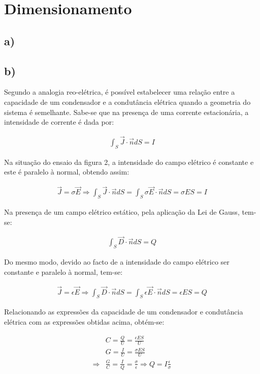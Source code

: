 \documentclass[portuguese, a4paper, titlepage]{article}
\begin{document}
	\section{Dimensionamento}
	\subsection{a)}

	\subsection{b)}
	Segundo a analogia reo-elétrica, é possível estabelecer uma relação entre a capacidade de um condensador e a condutância elétrica quando a geometria do sistema é semelhante.
	Sabe-se que na presença de uma corrente estacionária, a intensidade de corrente é dada por:

	\begin{align*}
		\int _ { S } \vec{J} \cdot \vec{n} d S = I
	\end{align*}

	Na situação do ensaio da figura 2, a intensidade do campo elétrico é constante e este é paralelo à normal, obtendo assim:

	\begin{align*}
		\vec{J} = \sigma \vec{E} \Rightarrow \int _ { S } \vec{J} \cdot \vec{n} d S = \int _ { S } \sigma \vec{E} \cdot \vec{n} d S  = \sigma E S = I
	\end{align*}

	Na presença de um campo elétrico estático, pela aplicação da Lei de Gauss, tem-se:

	\begin{align*}
			\int _ { S } \vec{D} \cdot \vec{n} d S = Q
	\end{align*}

	Do mesmo modo, devido ao facto de a intensidade do campo elétrico ser constante e paralelo à normal, tem-se:

	\begin{align*}
		\vec{J} = \epsilon \vec{E} \Rightarrow \int _ { S } \vec{D} \cdot \vec{n} d S = \int _ { S } \epsilon \vec{E} \cdot \vec{n} d S = \epsilon E S = Q
	\end{align*}

	Relacionando as expressões da capacidade de um condensador e condutância elétrica com as expressões obtidas acima, obtém-se:

	\begin{align*}
		&C =  \frac{Q}{U} = \frac{\epsilon E S}{U} \\
		&G = \frac{I}{U} = \frac{\sigma E S}{U} \\ 
		\Rightarrow &\frac{G}{C} = \frac{I}{Q} = \frac{\sigma}{\epsilon} \Rightarrow Q = I\frac{\epsilon}{\sigma}
	\end{align*}
	
\end{document}

